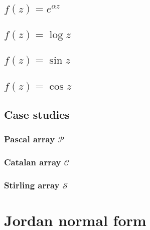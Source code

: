 

\subsection{$f(z)=e^{\alpha z}$}



\subsection{$f(z)=\log{z}$}



\subsection{$f(z)=\sin{z}$}



\subsection{$f(z)=\cos{z}$}



\subsection{Case studies}

\subsubsection{Pascal array $\mathcal{P}$}



\subsubsection{Catalan array $\mathcal{C}$}



\subsubsection{Stirling array $\mathcal{S}$}




\section{Jordan normal form}

